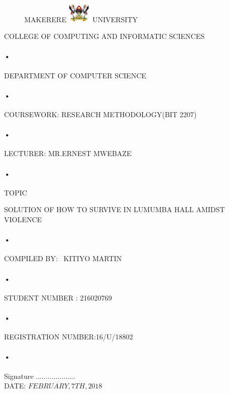 \documentclass[10pt,A4paper]{article}
\begin{document}
\begin{titlepage}
 \begin{figure}[h]
  \centerline{\small MAKERERE 
  \includegraphics[width=0.1\textwidth]{muk_log} UNIVERSITY}
\end{figure}
\centerline{COLLEGE OF COMPUTING AND INFORMATIC SCIENCES}
\paragraph{•}
\centerline{DEPARTMENT OF COMPUTER SCIENCE\\}
\paragraph{•}

\centerline{COURSEWORK: RESEARCH METHODOLOGY(BIT 2207)\\}
\paragraph{•}

\centerline{LECTURER: MR.ERNEST MWEBAZE}
\paragraph{•}

\centerline{TOPIC\\}SOLUTION OF HOW TO SURVIVE IN LUMUMBA HALL AMIDST VIOLENCE \\
\paragraph{•}
\centerline{COMPILED BY: \
 KITIYO MARTIN}
 \paragraph{•}
\centerline{STUDENT NUMBER : 216020769}
\paragraph{•}
\centerline{REGISTRATION NUMBER:16/U/18802}
\paragraph{•}
\begin{flushright}
    Signature ....................\\
    DATE: $ FEBRUARY,7{TH},2018$
\end{flushright}
\end{titlepage}
\newpage
\tableofcontents
\newpage
{}
\end{document}
